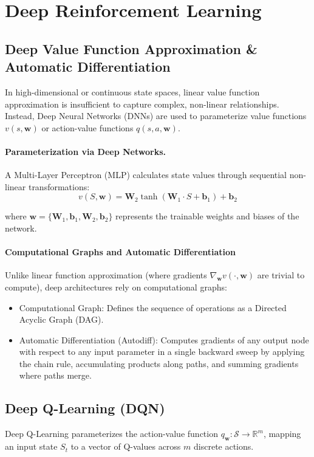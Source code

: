 \section{Deep Reinforcement Learning}
\subsection{Deep Value Function Approximation \& Automatic Differentiation}
In high-dimensional or continuous state spaces, linear value function approximation is insufficient to capture complex, non-linear relationships. Instead, Deep Neural Networks (DNNs) are used to parameterize value functions $v(s, \mathbf{w})$ or action-value functions $q(s, a, \mathbf{w})$.

\paragraph{Parameterization via Deep Networks.} A Multi-Layer Perceptron (MLP) calculates state values through sequential non-linear transformations:
$$v(S, \mathbf{w}) = \mathbf{W}_2 \tanh(\mathbf{W}_1 \cdot S + \mathbf{b}_1) + \mathbf{b}_2$$

where $\mathbf{w} = \{\mathbf{W}_1, \mathbf{b}_1, \mathbf{W}_2, \mathbf{b}_2\}$ represents the trainable weights and biases of the network.

\paragraph{Computational Graphs and Automatic Differentiation} Unlike linear function approximation (where gradients $\nabla_\mathbf{w} v(\cdot, \mathbf{w})$ are trivial to compute), deep architectures rely on computational graphs:
\begin{itemize}
    \item Computational Graph: Defines the sequence of operations as a Directed Acyclic Graph (DAG).
    \item Automatic Differentiation (Autodiff): Computes gradients of any output node with respect to any input parameter in a single backward sweep by applying the chain rule, accumulating products along paths, and summing gradients where paths merge.
\end{itemize}

\subsection{Deep Q-Learning (DQN)}
Deep Q-Learning parameterizes the action-value function $q_\mathbf{w}: \mathcal{S} \to \mathbb{R}^m$, mapping an input state $S_t$ to a vector of Q-values across $m$ discrete actions. 


